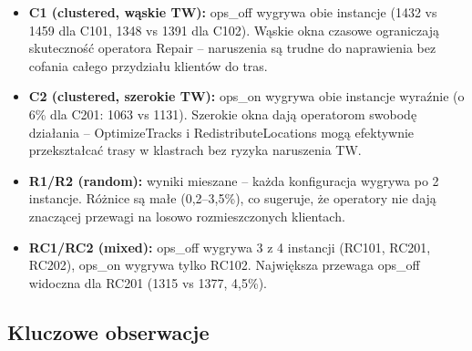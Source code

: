 \documentclass[11pt,a4paper]{article}
\begin{document}
\begin{itemize}
    \item \textbf{C1 (clustered, wąskie TW):} ops\_off wygrywa obie instancje
          (1432 vs 1459 dla C101, 1348 vs 1391 dla C102). Wąskie okna czasowe
          ograniczają skuteczność operatora Repair -- naruszenia są trudne do naprawienia
          bez cofania całego przydziału klientów do tras.
    \item \textbf{C2 (clustered, szerokie TW):} ops\_on wygrywa obie instancje
          wyraźnie (o 6\% dla C201: 1063 vs 1131). Szerokie okna dają operatorom
          swobodę działania -- OptimizeTracks i RedistributeLocations mogą efektywnie
          przekształcać trasy w klastrach bez ryzyka naruszenia TW.
    \item \textbf{R1/R2 (random):} wyniki mieszane -- każda konfiguracja wygrywa
          po 2 instancje. Różnice są małe (0{,}2--3{,}5\%), co sugeruje, że operatory
          nie dają znaczącej przewagi na losowo rozmieszczonych klientach.
    \item \textbf{RC1/RC2 (mixed):} ops\_off wygrywa 3 z 4 instancji (RC101, RC201, RC202),
          ops\_on wygrywa tylko RC102. Największa przewaga ops\_off widoczna dla RC201
          (1315 vs 1377, 4{,}5\%).
\end{itemize}

\subsection{Kluczowe obserwacje}
\end{document}

